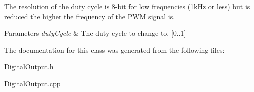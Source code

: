 \-The resolution of the duty cycle is 8-\/bit for low frequencies (1k\-Hz or less) but is reduced the higher the frequency of the \hyperlink{classPWM}{\-P\-W\-M} signal is.


\begin{DoxyParams}{\-Parameters}
{\em duty\-Cycle} & \-The duty-\/cycle to change to. \mbox{[}0..1\mbox{]} \\
\hline
\end{DoxyParams}


\-The documentation for this class was generated from the following files\-:\begin{DoxyCompactItemize}
\item 
\-Digital\-Output.\-h\item 
\-Digital\-Output.\-cpp\end{DoxyCompactItemize}
